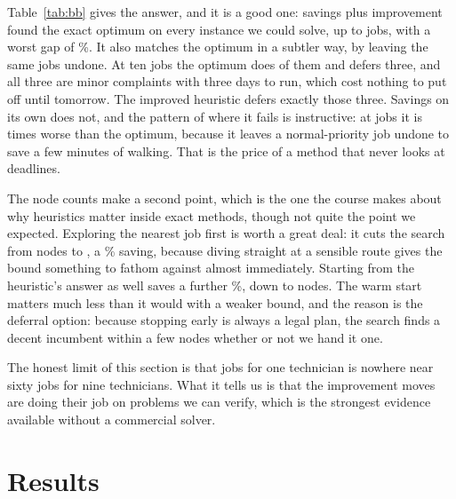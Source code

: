 \documentclass[11pt]{article}
\begin{document}
\begin{table}[h]\centering\small

\caption{The heuristics against the exact optimum, for one technician.
The ``Done'' column is how many of the jobs the optimum chooses to do, the
rest being minor complaints that cost nothing to defer. The last two columns
count the nodes the same search explored when it took the nearest job first
and started from the heuristic's answer, and when it did neither.}
\label{tab:bb}
\end{table}

Table~\ref{tab:bb} gives the answer, and it is a good one: savings plus
improvement found the exact optimum on every instance we could solve, up to
\NBbMaxTickets{} jobs, with a worst gap of \NBbGapWorst\%. It also matches
the optimum in a subtler way, by leaving the same jobs undone. At ten jobs the
optimum does \NBbServed{} of them and defers three, and all three are minor
complaints with three days to run, which cost nothing to put off until
tomorrow. The improved heuristic defers exactly those three. Savings on its
own does not, and the pattern of where it fails is instructive: at
\NBbSavWorstJobs{} jobs it is \NBbSavWorstTimes{} times worse than the
optimum, because it leaves a normal-priority job undone to save a few minutes
of walking. That is the price of a method that never looks at deadlines.

The node counts make a second point, which is the one the course makes about
why heuristics matter inside exact methods, though not quite the point we
expected. Exploring the nearest job first is worth a great deal: it cuts the
search from \NBbNodesArbCold{} nodes to \NBbNodesCold{}, a
\NBbOrderCutPct\% saving, because diving straight at a sensible route gives
the bound something to fathom against almost immediately. Starting from the
heuristic's answer as well saves a further \NBbWarmCutPct\%, down to
\NBbNodesWarm{} nodes. The warm start matters much less than it would with a
weaker bound, and the reason is the deferral option: because stopping early
is always a legal plan, the search finds a decent incumbent within a few
nodes whether or not we hand it one.

The honest limit of this section is that \NBbMaxTickets{} jobs for one
technician is nowhere near sixty jobs for nine technicians. What it tells us
is that the improvement moves are doing their job on problems we can verify,
which is the strongest evidence available without a commercial solver.

\section{Results}
\label{sec:results}
\end{document}
